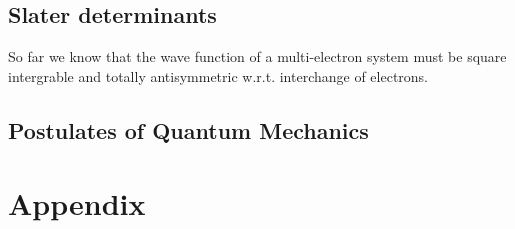 \documentclass[a4paper]{article}
\begin{document}
\subsection{Slater determinants}
So far we know that the wave function of a multi-electron system must be square intergrable and totally antisymmetric w.r.t. interchange of electrons. 












\subsection{Postulates of Quantum Mechanics \label{postulates}}
































\section{Appendix}
\end{document}
